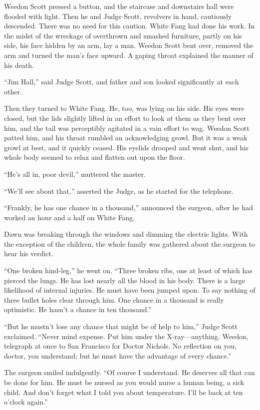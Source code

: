 \documentclass[10pt]{book}
\begin{document}
Weedon Scott pressed a button, and the staircase and downstairs hall
were flooded with light. Then he and Judge Scott, revolvers in hand,
cautiously descended. There was no need for this caution. White Fang
had done his work. In the midst of the wreckage of overthrown and
smashed furniture, partly on his side, his face hidden by an arm, lay a
man. Weedon Scott bent over, removed the arm and turned the man’s face
upward. A gaping throat explained the manner of his death.

“Jim Hall,” said Judge Scott, and father and son looked significantly
at each other.

Then they turned to White Fang. He, too, was lying on his side. His
eyes were closed, but the lids slightly lifted in an effort to look at
them as they bent over him, and the tail was perceptibly agitated in a
vain effort to wag. Weedon Scott patted him, and his throat rumbled an
acknowledging growl. But it was a weak growl at best, and it quickly
ceased. His eyelids drooped and went shut, and his whole body seemed to
relax and flatten out upon the floor.

“He’s all in, poor devil,” muttered the master.

“We’ll see about that,” asserted the Judge, as he started for the
telephone.

“Frankly, he has one chance in a thousand,” announced the surgeon,
after he had worked an hour and a half on White Fang.

Dawn was breaking through the windows and dimming the electric lights.
With the exception of the children, the whole family was gathered about
the surgeon to hear his verdict.

“One broken hind-leg,” he went on. “Three broken ribs, one at least of
which has pierced the lungs. He has lost nearly all the blood in his
body. There is a large likelihood of internal injuries. He must have
been jumped upon. To say nothing of three bullet holes clear through
him. One chance in a thousand is really optimistic. He hasn’t a chance
in ten thousand.”

“But he mustn’t lose any chance that might be of help to him,” Judge
Scott exclaimed. “Never mind expense. Put him under the X-ray—anything.
Weedon, telegraph at once to San Francisco for Doctor Nichols. No
reflection on you, doctor, you understand; but he must have the
advantage of every chance.”

The surgeon smiled indulgently. “Of course I understand. He deserves
all that can be done for him. He must be nursed as you would nurse a
human being, a sick child. And don’t forget what I told you about
temperature. I’ll be back at ten o’clock again.”
\end{document}
